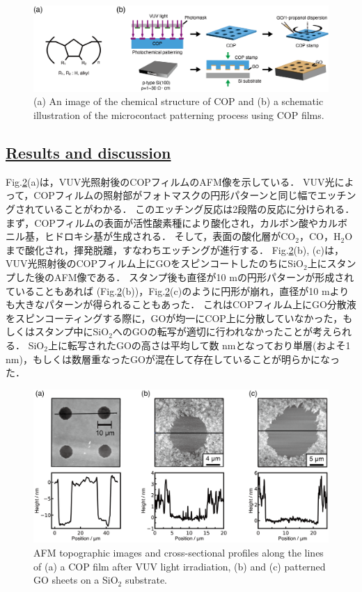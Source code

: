 \documentclass[platex,dvipdfmx]{jlreq}			%
\begin{document}
\begin{figure}[H]
    \centering
    \includegraphics[width=120mm]{figures/figure5.png}
    \caption{(a) An image of the chemical structure of COP and (b) a schematic illustration of the microcontact patterning process using COP films.}
    \label{fig:COP}
\end{figure}

\subsection*{\ul{Results and discussion}}

Fig.\ref{fig:COP_AFM}(a)は，VUV光照射後のCOPフィルムのAFM像を示している．
VUV光によって，COPフィルムの照射部がフォトマスクの円形パターンと同じ幅でエッチングされていることがわかる．
このエッチング反応は2段階の反応に分けられる\supercite{sugimura_ultra-violet_2018}．
まず，COPフィルムの表面が活性酸素種により酸化され，カルボン酸やカルボニル基，ヒドロキシ基が生成される．
そして，表面の酸化層がCO$_2$，CO，H$_2$Oまで酸化され，揮発脱離，すなわちエッチングが進行する．
Fig.\ref{fig:COP_AFM}(b), (c)は，VUV光照射後のCOPフィルム上にGOをスピンコートしたのちにSiO$_2$上にスタンプした後のAFM像である．
スタンプ後も直径が10 \textmu mの円形パターンが形成されていることもあれば (Fig.\ref{fig:COP_AFM}(b))，Fig.\ref{fig:COP_AFM}(c)のように円形が崩れ，直径が10 \textmu mよりも大きなパターンが得られることもあった．
これはCOPフィルム上にGO分散液をスピンコーティングする際に，GOが均一にCOP上に分散していなかった，もしくはスタンプ中にSiO$_2$へのGOの転写が適切に行われなかったことが考えられる．
SiO$_2$上に転写されたGOの高さは平均して数 nmとなっており単層(およそ1 nm)，もしくは数層重なったGOが混在して存在していることが明らかになった．

\begin{figure}[H]
    \centering
    \includegraphics[width=150mm]{figures/figure6.png}
    \caption{AFM topographic images and cross-sectional profiles along the lines of (a) a COP film after VUV light irradiation, (b) and (c) patterned GO sheets on a SiO$_2$ substrate.}
    \label{fig:COP_AFM}
\end{figure}
\end{document}
